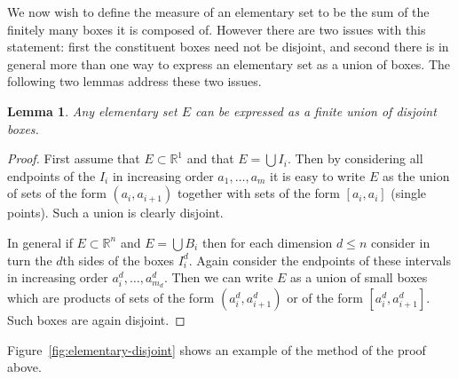 \documentclass[11pt,oneside]{amsbook}
\newcommand{\RR}{{\mathbb R}}
\theoremstyle{definition}
\theoremstyle{plain}
\newtheorem{lem}[thm]{Lemma}
\theoremstyle{definition}
\theoremstyle{remark}
\numberwithin{equation}{section}
\numberwithin{figure}{section}
\begin{document}
We now wish to define the measure of an elementary set to be the sum of the finitely many boxes it is composed of. However there are two issues with this statement: first the constituent boxes need not be disjoint, and second there is in general more than one way to express an elementary set as a union of boxes. The following two lemmas address these two issues.

\begin{lem}
  Any elementary set $E$ can be expressed as a finite union of disjoint boxes.
\end{lem}

\begin{proof}
  First assume that $E\subset\RR^1$ and that $E=\bigcup I_i$. Then by considering all endpoints of the $I_i$ in increasing order $a_1,\ldots,a_m$ it is easy to write $E$ as the union of sets of the form $(a_i,a_{i+1})$ together with sets of the form $[a_i,a_i]$ (single points). Such a union is clearly disjoint.

  In general if $E\subset\RR^n$ and $E=\bigcup B_i$ then for each dimension $d\leq n$ consider in turn the $d$th sides of the boxes $I_i^d$. Again consider the endpoints of these intervals in increasing order $a_i^d,\ldots,a_{m_d}^d$. Then we can write $E$ as a union of small boxes which are products of sets of the form $(a_i^d,a_{i+1}^d)$ or of the form $[a_i^d,a_{i+1}^d]$. Such boxes are again disjoint.
\end{proof}

Figure~\ref{fig:elementary-disjoint} shows an example of the method of the proof above.
\end{document}
